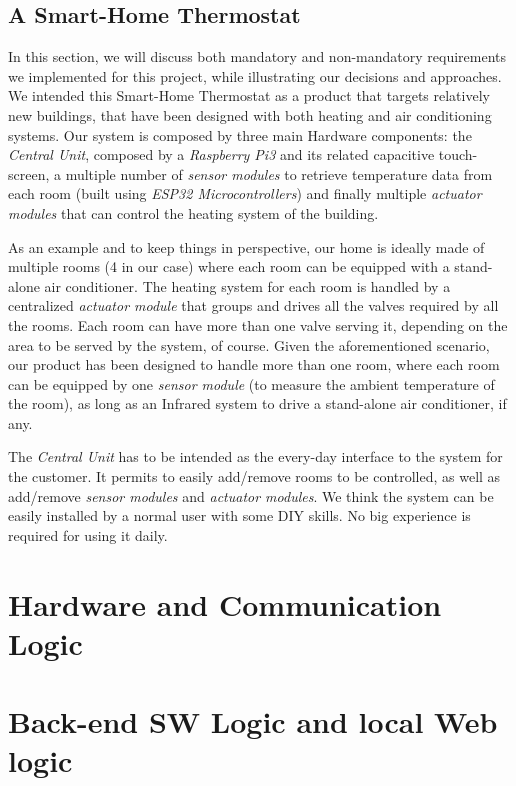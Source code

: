 \documentclass[a4paper]{article}
\begin{document}
        \subsection{A Smart-Home Thermostat}
        In this section, we will discuss both mandatory and non-mandatory requirements we implemented for this project, while illustrating our decisions and approaches.
        We intended this Smart-Home Thermostat as a product that targets relatively new buildings, that have been designed with both heating and air conditioning systems.
        Our system is composed by three main Hardware components: the \emph{Central Unit}, composed by a \emph{Raspberry Pi3} and its related capacitive touch-screen, a multiple number of \emph{sensor modules} to retrieve temperature data from each room (built using \emph{ESP32 Microcontrollers}) and finally multiple \emph{actuator modules} that can control the heating system of the building.

        As an example and to keep things in perspective, our home is ideally made of multiple rooms (4 in our case) where each room can be equipped with a stand-alone air conditioner. The heating system for each room is handled by a centralized \emph{actuator module} that groups and drives all the valves required by all the rooms. Each room can have more than one valve serving it, depending on the area to be served by the system, of course.
        Given the aforementioned scenario, our product has been designed to handle more than one room, where each room can be equipped by one \emph{sensor module} (to measure the ambient temperature of the room), as long as an Infrared system to drive a stand-alone air conditioner, if any.

        The \emph{Central Unit} has to be intended as the every-day interface to the system for the customer. It permits to easily add/remove rooms to be controlled, as well as add/remove \emph{sensor modules} and \emph{actuator modules}. We think the system can be easily installed by a normal user with some DIY skills. No big experience is required for using it daily.

    \section{Hardware and Communication Logic}

    \section{Back-end SW Logic and local Web logic}
\end{document}
